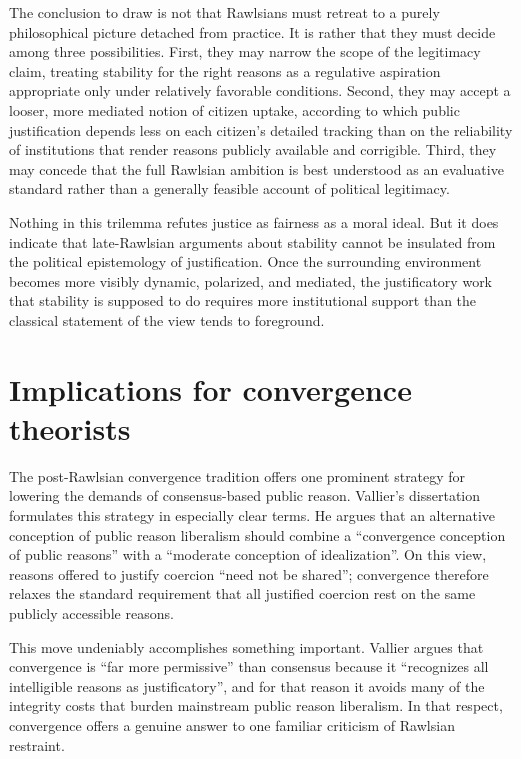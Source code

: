 \documentclass[12pt]{report}
\begin{document}
The conclusion to draw is not that Rawlsians must retreat to a purely philosophical picture detached from practice. It is rather that they must decide among three possibilities. First, they may narrow the scope of the legitimacy claim, treating stability for the right reasons as a regulative aspiration appropriate only under relatively favorable conditions. Second, they may accept a looser, more mediated notion of citizen uptake, according to which public justification depends less on each citizen's detailed tracking than on the reliability of institutions that render reasons publicly available and corrigible. Third, they may concede that the full Rawlsian ambition is best understood as an evaluative standard rather than a generally feasible account of political legitimacy.

Nothing in this trilemma refutes justice as fairness as a moral ideal. But it does indicate that late-Rawlsian arguments about stability cannot be insulated from the political epistemology of justification. Once the surrounding environment becomes more visibly dynamic, polarized, and mediated, the justificatory work that stability is supposed to do requires more institutional support than the classical statement of the view tends to foreground.

\section{Implications for convergence theorists}

The post-Rawlsian convergence tradition offers one prominent strategy for lowering the demands of consensus-based public reason. Vallier's dissertation formulates this strategy in especially clear terms. He argues that an alternative conception of public reason liberalism should combine a \enquote{convergence conception of public reasons} with a \enquote{moderate conception of idealization}. \parencite[p.~8]{vallier2011diss}
On this view, reasons offered to justify coercion \enquote{need not be shared}; convergence therefore relaxes the standard requirement that all justified coercion rest on the same publicly accessible reasons. \parencite[p.~8]{vallier2011diss}

This move undeniably accomplishes something important. Vallier argues that convergence is \enquote{far more permissive} than consensus because it \enquote{recognizes all intelligible reasons as justificatory}, and for that reason it avoids many of the integrity costs that burden mainstream public reason liberalism. \parencite[p.~191]{vallier2011diss}
In that respect, convergence offers a genuine answer to one familiar criticism of Rawlsian restraint.
\end{document}
